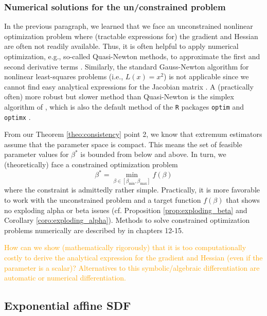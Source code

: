 \subsubsection{Numerical solutions for the un/constrained problem}

In the previous paragraph, we learned that we face an unconstrained nonlinear optimization problem where (tractable expressions for) the gradient and Hessian are often not readily available.
Thus, it is often helpful to apply numerical optimization, e.g., so-called Quasi-Newton methods, to approximate the first and second derivative terms \cite[Chapter 6]{NW06}.
Similarly, the standard Gauss-Newton algorithm for nonlinear least-squares problems (i.e., $L(x)=x^2$) is not applicable since we cannot find easy analytical expressions for the Jacobian matrix \cite[Section 4.5]{Beck14}.
A (practically often) more robust but slower method than Quasi-Newton is the simplex algorithm of \cite{NM65}, which is also the default method of the \texttt{R} packages \texttt{optim} and \texttt{optimx} \cite[Sections 8.1 and 9.1]{N14}.

From our Theorem \ref{theo:consistency} point 2, we know that extremum estimators assume that the parameter space is compact.
This means the set of feasible parameter values for $\beta^*$ is bounded from below and above.
In turn, we (theoretically) face a constrained optimization problem
\[
\beta^* = \min_{\beta \in \left[ \beta_{\mathrm{min}}, \beta_{\mathrm{max}} \right]} f(\beta)
\]
where the constraint is admittedly rather simple.
Practically, it is more favorable to work with the unconstrained problem and a target function $f(\beta)$ that shows no exploding alpha or beta issues (cf. Proposition \ref{prop:exploding_beta} and Corollary \ref{coro:exploding_alpha}).
Methods to solve constrained optimization problems numerically are described by \cite{NW06} in chapters 12-15.

\textcolor{orange}{
	\begin{exercise}
		How can we show (mathematically rigorously) that it is too computationally costly to derive the analytical expression for the gradient and Hessian (even if the parameter is a scalar)?
		Alternatives to this symbolic/algebraic differentiation are automatic or numerical differentiation.
	\end{exercise}
}

\fi

\subsection{Exponential affine SDF}


